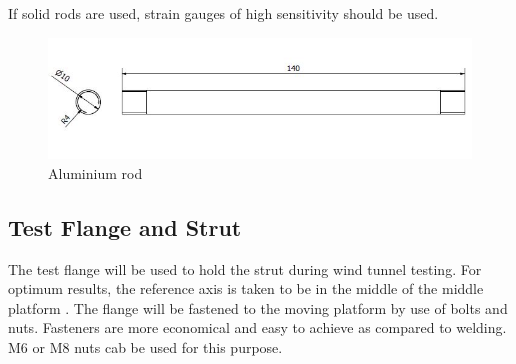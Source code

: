 If solid rods are used, strain gauges of high sensitivity should be used.
\begin{center}
	\begin{figure}[H]
	\centering
	\includegraphics[width=0.8\linewidth]{Figures/Rod}
	\caption[Aluminium rod]{Aluminium rod}
	\end{figure}
\end{center}

\subsection{Test Flange and Strut}
The test flange will be used to hold the strut during wind tunnel testing. For optimum results, the reference axis is taken to be in the middle of the middle platform \cite {fernandes_design_nodate}. The flange will be fastened to the moving platform by use of bolts and nuts. Fasteners are more economical and easy to achieve as compared to welding. M6 or M8 nuts cab be used for this purpose.

